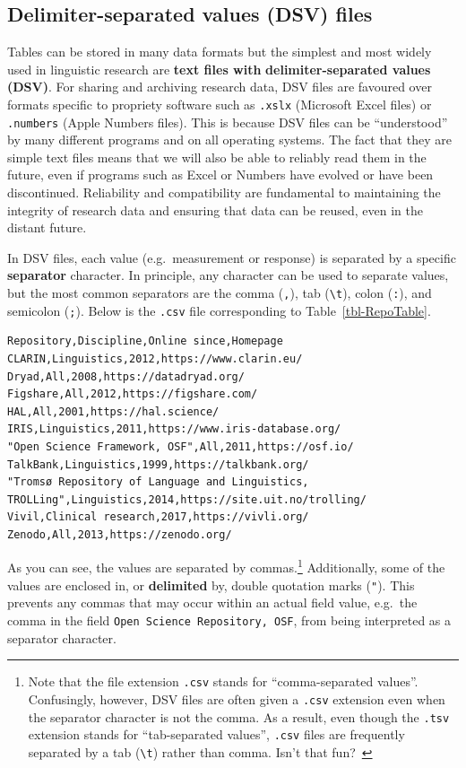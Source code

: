 \documentclass[
  letterpaper,
  DIV=11,
  numbers=noendperiod]{scrreprt}
\begin{document}
\subsection{Delimiter-separated values (DSV) files}\label{sec-DSV}

Tables can be stored in many data formats but the simplest and most
widely used in linguistic research are \textbf{text files with}
\textbf{delimiter-separated values (DSV)}. For sharing and archiving
research data, DSV files are favoured over formats specific to propriety
software such as \texttt{.xslx} (Microsoft Excel files) or
\texttt{.numbers} (Apple Numbers files). This is because DSV files can
be ``understood'' by many different programs and on all operating
systems. The fact that they are simple text files means that we will
also be able to reliably read them in the future, even if programs such
as Excel or Numbers have evolved or have been discontinued. Reliability
and compatibility are fundamental to maintaining the integrity of
research data and ensuring that data can be reused, even in the distant
future.

In DSV files, each value (e.g.~measurement or response) is separated by
a specific \textbf{separator} character. In principle, any character can
be used to separate values, but the most common separators are the comma
(\texttt{,}), tab (\texttt{\textbackslash{}t}), colon (\texttt{:}), and
semicolon (\texttt{;}). Below is the \texttt{.csv} file corresponding to
Table~\ref{tbl-RepoTable}.

\begin{verbatim}
Repository,Discipline,Online since,Homepage
CLARIN,Linguistics,2012,https://www.clarin.eu/
Dryad,All,2008,https://datadryad.org/
Figshare,All,2012,https://figshare.com/
HAL,All,2001,https://hal.science/
IRIS,Linguistics,2011,https://www.iris-database.org/
"Open Science Framework, OSF",All,2011,https://osf.io/
TalkBank,Linguistics,1999,https://talkbank.org/
"Tromsø Repository of Language and Linguistics, TROLLing",Linguistics,2014,https://site.uit.no/trolling/
Vivil,Clinical research,2017,https://vivli.org/
Zenodo,All,2013,https://zenodo.org/
\end{verbatim}

As you can see, the values are separated by commas.\footnote{Note that
  the file extension \texttt{.csv} stands for ``comma-separated
  values''. Confusingly, however, DSV files are often given a
  \texttt{.csv} extension even when the separator character is not the
  comma. As a result, even though the \texttt{.tsv} extension stands for
  ``tab-separated values'', \texttt{.csv} files are frequently separated
  by a tab (\texttt{\textbackslash{}t}) rather than comma. Isn't that
  fun?~} Additionally, some of the values are
enclosed in, or \textbf{delimited} by, double quotation marks
(\texttt{"}). This prevents any commas that may occur within an actual
field value, e.g.~the comma in the field
\texttt{Open\ Science\ Repository,\ OSF}, from being interpreted as a
separator character.
\end{document}

